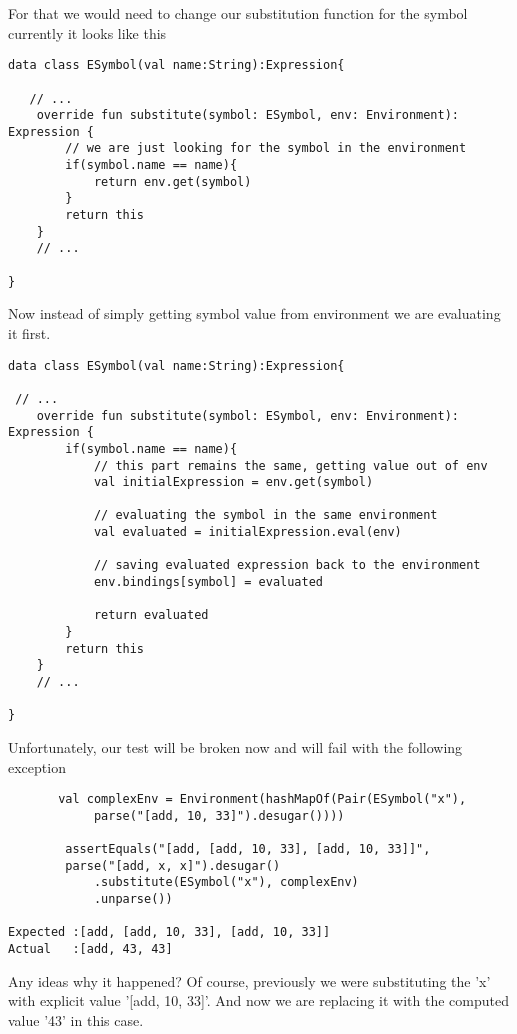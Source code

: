 \documentclass[11pt]{article}
\begin{document}
For that we would need to change our substitution function for the symbol
currently it looks like this
\begin{verbatim}
data class ESymbol(val name:String):Expression{

   // ...
    override fun substitute(symbol: ESymbol, env: Environment): Expression {
        // we are just looking for the symbol in the environment
        if(symbol.name == name){
            return env.get(symbol)
        }
        return this
    }
    // ...

}

\end{verbatim}

Now instead of simply getting symbol value from environment we are evaluating it first.

\begin{verbatim}
data class ESymbol(val name:String):Expression{

 // ...
    override fun substitute(symbol: ESymbol, env: Environment): Expression {
        if(symbol.name == name){
            // this part remains the same, getting value out of env
            val initialExpression = env.get(symbol)

            // evaluating the symbol in the same environment
            val evaluated = initialExpression.eval(env)

            // saving evaluated expression back to the environment
            env.bindings[symbol] = evaluated

            return evaluated
        }
        return this
    }
    // ...

}
\end{verbatim}

Unfortunately, our test will be broken now and will fail with the following exception
\begin{verbatim}
       val complexEnv = Environment(hashMapOf(Pair(ESymbol("x"),
            parse("[add, 10, 33]").desugar())))

        assertEquals("[add, [add, 10, 33], [add, 10, 33]]",
        parse("[add, x, x]").desugar()
            .substitute(ESymbol("x"), complexEnv)
            .unparse())

Expected :[add, [add, 10, 33], [add, 10, 33]]
Actual   :[add, 43, 43]
\end{verbatim}

Any ideas why it happened?
Of course, previously we were substituting the 'x' with explicit value '[add, 10, 33]'.
And now we are replacing it with the computed value '43' in this case.
\end{document}
